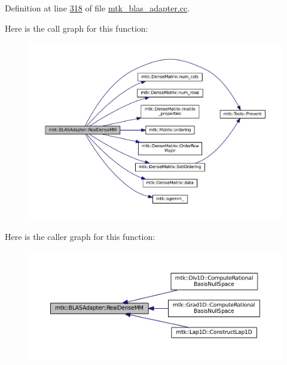 Definition at line \hyperlink{mtk__blas__adapter_8cc_source_l00318}{318} of file \hyperlink{mtk__blas__adapter_8cc_source}{mtk\-\_\-blas\-\_\-adapter.\-cc}.



Here is the call graph for this function\-:
\nopagebreak
\begin{figure}[H]
\begin{center}
\leavevmode
\includegraphics[width=350pt]{classmtk_1_1BLASAdapter_acebd0e9bfe0bdd609c7fbea98ccfd3b5_cgraph}
\end{center}
\end{figure}




Here is the caller graph for this function\-:
\nopagebreak
\begin{figure}[H]
\begin{center}
\leavevmode
\includegraphics[width=350pt]{classmtk_1_1BLASAdapter_acebd0e9bfe0bdd609c7fbea98ccfd3b5_icgraph}
\end{center}
\end{figure}


